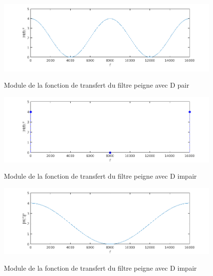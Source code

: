 \begin{figure}[!ht]
		\begin{center}
			\includegraphics[width=1\textwidth]{img/modulePeigneDpair2}
			\label{fig:modulePeigneDpair2}
			\caption{Module de la fonction de transfert du filtre peigne avec D pair}
		\end{center}
\end{figure}

\begin{figure}[!ht]
		\begin{center}
			\includegraphics[width=1\textwidth]{img/modulePeigneDimpair}
			\label{fig:modulePeigneDimpair}
			\caption{Module de la fonction de transfert du filtre peigne avec D impair}
		\end{center}
\end{figure}

\begin{figure}[!ht]
		\begin{center}
			\includegraphics[width=1\textwidth]{img/modulePeigneDimpair2}
			\label{fig:modulePeigneDimpair2}
			\caption{Module de la fonction de transfert du filtre peigne avec D impair}
		\end{center}
\end{figure}

